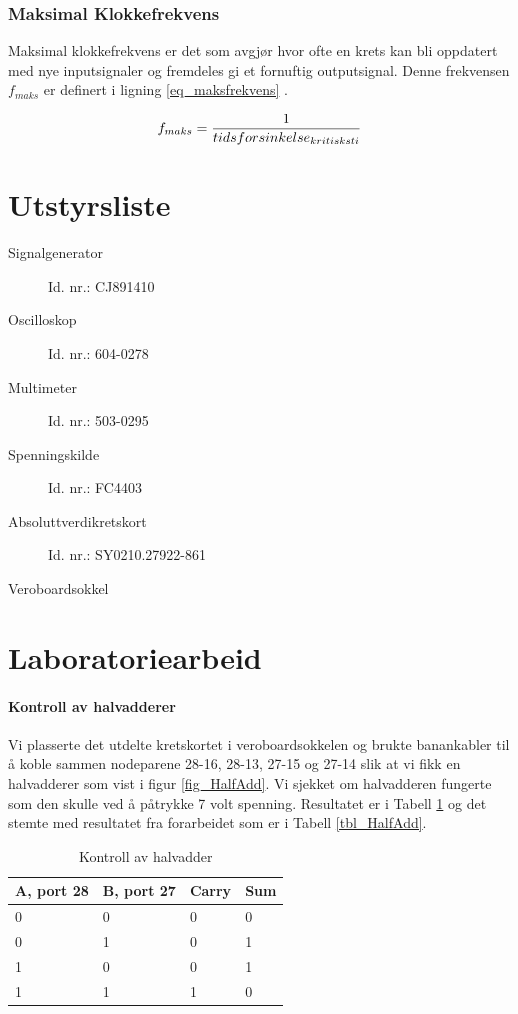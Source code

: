 \documentclass[11pt, a4paper, norwegian]{article}
\begin{document}
\subsubsection{Maksimal Klokkefrekvens}
Maksimal klokkefrekvens er det som avgjør hvor ofte en krets kan bli oppdatert med nye inputsignaler og fremdeles gi et fornuftig outputsignal. Denne frekvensen $f_{maks}$ er definert i ligning \ref{eq_maksfrekvens} \cite{labhefte}. 

\begin{equation} \label{eq_maksfrekvens}
f_{maks} = \frac{1}{tidsforsinkelse_{kritisk \space sti}}
\end{equation}

\section{Utstyrsliste}
\begin{description}
\item[Signalgenerator]{Id. nr.: CJ891410}
\item[Oscilloskop]{Id. nr.: 604-0278}
\item[Multimeter]{Id. nr.: 503-0295}
\item[Spenningskilde]{Id. nr.: FC4403}
\item[Absoluttverdikretskort]{Id. nr.: SY0210.27922-861}
\item[Veroboardsokkel]{}
\end{description}


\section{Laboratoriearbeid} \label{sec_labarb}

\paragraph{Kontroll av halvadderer}
Vi plasserte det utdelte kretskortet i veroboardsokkelen og brukte banankabler til å koble sammen nodeparene 28-16, 28-13, 27-15 og 27-14 slik at vi fikk en halvadderer som vist i figur \ref{fig_HalfAdd}. Vi sjekket om halvadderen fungerte som den skulle ved å påtrykke 7 volt spenning. Resultatet er i Tabell \ref{tbl_halfAddTest} og det stemte med resultatet fra forarbeidet som er i Tabell \ref{tbl_HalfAdd}. 

\begin{table}[h]
\centering
\caption{Kontroll av halvadder}
\label{tbl_halfAddTest}
\begin{tabular}{|l|l||l|l|}
\hline
A, port 28 & B, port 27 & Carry & Sum \\ \hline
0          & 0          & 0     & 0   \\
0          & 1          & 0     & 1   \\
1          & 0          & 0     & 1   \\
1          & 1          & 1     & 0   \\ \hline
\end{tabular}
\end{table}
\end{document}
